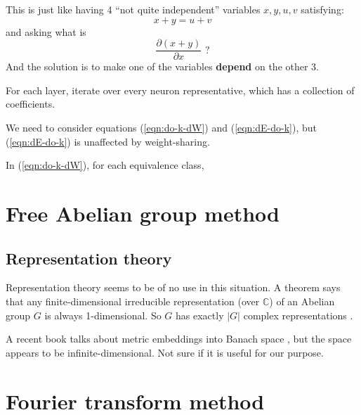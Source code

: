 This is just like having 4 ``not quite independent'' variables $x, y, u, v$ satisfying:
\begin{equation}
x + y = u + v
\end{equation}
and asking what is
\begin{equation}
\frac{\partial (x + y)}{\partial x} \mbox{ ?}
\end{equation}
And the solution is to make one of the variables \textbf{depend} on the other 3.

For each layer, iterate over every neuron representative, which has a collection of coefficients.

We need to consider equations (\ref{eqn:do-k-dW}) and (\ref{eqn:dE-do-k}), but (\ref{eqn:dE-do-k}) is unaffected by weight-sharing.

In (\ref{eqn:do-k-dW}), for each equivalence class, 

\section{Free Abelian group method}

\subsection{Representation theory}

Representation theory seems to be of no use in this situation.  A theorem says that any finite-dimensional irreducible representation (over $\mathbb{C}$) of an Abelian group $G$ is always 1-dimensional.  So $G$ has exactly $|G|$ complex representations \parencite{Qiu2011}.

A recent book talks about metric embeddings into Banach space \parencite{Ostrovskii2013}, but the space appears to be infinite-dimensional.  Not sure if it is useful for our purpose.

\section{Fourier transform method}

